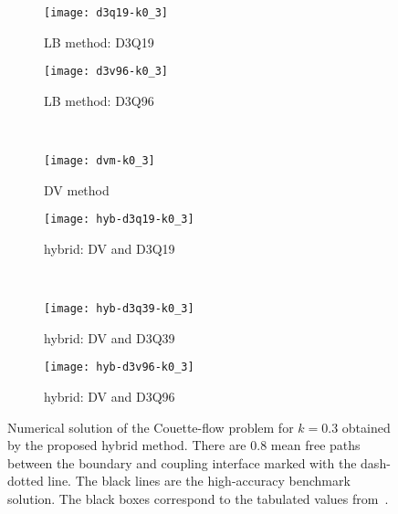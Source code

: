\documentclass{elsarticle} %
\begin{document}
\begin{figure}
   \centering
   \begin{subfigure}[b]{0.5\textwidth}
       \texttt{[image: d3q19-k0\_3]}
       \caption{LB method: D3Q19}
       \label{fig:d3q19-k0_3}
   \end{subfigure}%
   \begin{subfigure}[b]{0.5\textwidth}
       \texttt{[image: d3v96-k0\_3]}
       \caption{LB method: D3Q96}
       \label{fig:d3q96-k0_3}
   \end{subfigure}\\
   \begin{subfigure}[b]{0.5\textwidth}
       \texttt{[image: dvm-k0\_3]}
       \caption{DV method}
       \label{fig:dvm-k0_3}
   \end{subfigure}%
   \begin{subfigure}[b]{0.5\textwidth}
       \texttt{[image: hyb-d3q19-k0\_3]}
       \caption{hybrid: DV and D3Q19}
       \label{fig:hyb:d3q19-k0_3}
   \end{subfigure}\\
   \begin{subfigure}[b]{0.5\textwidth}
       \texttt{[image: hyb-d3q39-k0\_3]}
       \caption{hybrid: DV and D3Q39}
       \label{fig:hyb:d3q39-k0_3}
   \end{subfigure}%
   \begin{subfigure}[b]{0.5\textwidth}
       \texttt{[image: hyb-d3v96-k0\_3]}
       \caption{hybrid: DV and D3Q96}
       \label{fig:hyb:d3q96-k0_3}
   \end{subfigure}
   \caption{
       Numerical solution of the Couette-flow problem for \(k=0.3\) obtained by the proposed hybrid method.
       There are \(0.8\) mean free paths between the boundary and coupling interface marked with the dash-dotted line.
       The black lines are the high-accuracy benchmark solution.
       The black boxes correspond to the tabulated values from~\cite{Luo2016}.
   }\label{fig:k0_3}
\end{figure}
\end{document}
